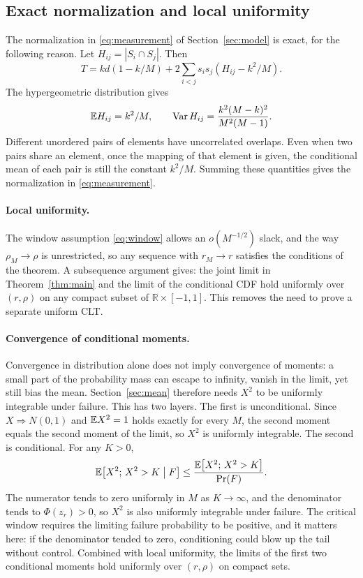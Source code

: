 \subsection{Exact normalization and local uniformity}\label{app:normalization}
The normalization in \eqref{eq:measurement} of Section~\ref{sec:model} is exact, for the following reason.
Let $H_{ij}=|S_i\cap S_j|$. Then
\begin{equation*}
T=kd(1-k/M)+2\sum_{i<j}s_i s_j(H_{ij}-k^2/M).
\end{equation*}
The hypergeometric distribution gives
\begin{equation*}
\mathbb E H_{ij}=k^2/M,\qquad
\operatorname{Var} H_{ij}=\frac{k^2(M-k)^2}{M^2(M-1)}.
\end{equation*}
Different unordered pairs of elements have uncorrelated overlaps. Even when two pairs share an element, once
the mapping of that element is given, the conditional mean of each pair is still the constant $k^2/M$.
Summing these quantities gives the normalization in \eqref{eq:measurement}.

\paragraph{Local uniformity.} The window assumption \eqref{eq:window} allows an $o(M^{-1/2})$ slack, and the
way $\rho_M\to\rho$ is unrestricted, so any sequence with $r_M\to r$ satisfies the conditions of the theorem.
A subsequence argument gives: the joint limit in Theorem~\ref{thm:main} and the limit of the conditional CDF
hold uniformly over $(r,\rho)$ on any compact subset of $\mathbb R\times[-1,1]$. This removes the need to
prove a separate uniform CLT.

\paragraph{Convergence of conditional moments.} Convergence in distribution alone does not imply convergence
of moments: a small part of the probability mass can escape to infinity, vanish in the limit, yet still bias
the mean. Section~\ref{sec:mean} therefore needs $X^2$ to be uniformly integrable under failure. This has two
layers. The first is unconditional. Since $X\Rightarrow N(0,1)$ and $\mathbb E X^2=1$ holds exactly for every $M$,
the second moment equals the second moment of the limit, so $X^2$ is uniformly integrable. The second is
conditional. For any $K>0$,
\begin{equation*}
\mathbb E\bigl[X^2;\,X^2>K\bigm|F\bigr]\le\frac{\mathbb E\bigl[X^2;\,X^2>K\bigr]}{\Pr(F)}.
\end{equation*}
The numerator tends to zero uniformly in $M$ as $K\to\infty$, and the denominator tends to $\Phi(z_r)>0$, so
$X^2$ is also uniformly integrable under failure. The critical window requires the limiting failure
probability to be positive, and it matters here: if the denominator tended to zero, conditioning could blow up
the tail without control. Combined with local uniformity, the limits of the first two conditional moments
hold uniformly over $(r,\rho)$ on compact sets.

